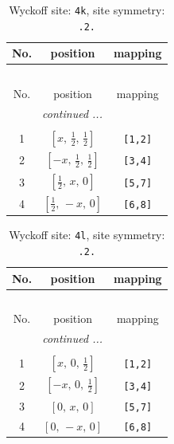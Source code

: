 \documentclass[fleqn,8pt]{jsarticle}
\begin{document}
\renewcommand{\arraystretch}{1.2}
\begin{longtable}{ccc}
\caption{Wyckoff site: {\tt 4k}, site symmetry: {\tt .2.}}
 \\
 \hline \hline
No. & position & mapping \\ \hline \endfirsthead

\multicolumn{2}{l}{\tablename\ \thetable{}} \\
 \hline \hline
No. & position & mapping \\ \hline \endhead

 \hline \hline
\multicolumn{2}{r}{\footnotesize\it continued ...} \\ \endfoot

 \hline \hline
\multicolumn{2}{r}{} \\ \endlastfoot

1 & $\left[ x,\, \frac{1}{2},\, \frac{1}{2} \right]$ & {\tt [1,2]} \\ \hline
2 & $\left[ - x,\, \frac{1}{2},\, \frac{1}{2} \right]$ & {\tt [3,4]} \\ \hline
3 & $\left[ \frac{1}{2},\, x,\, 0 \right]$ & {\tt [5,7]} \\ \hline
4 & $\left[ \frac{1}{2},\, - x,\, 0 \right]$ & {\tt [6,8]} \\
\end{longtable}
\renewcommand{\arraystretch}{1.2}
\begin{longtable}{ccc}
\caption{Wyckoff site: {\tt 4l}, site symmetry: {\tt .2.}}
 \\
 \hline \hline
No. & position & mapping \\ \hline \endfirsthead

\multicolumn{2}{l}{\tablename\ \thetable{}} \\
 \hline \hline
No. & position & mapping \\ \hline \endhead

 \hline \hline
\multicolumn{2}{r}{\footnotesize\it continued ...} \\ \endfoot

 \hline \hline
\multicolumn{2}{r}{} \\ \endlastfoot

1 & $\left[ x,\, 0,\, \frac{1}{2} \right]$ & {\tt [1,2]} \\ \hline
2 & $\left[ - x,\, 0,\, \frac{1}{2} \right]$ & {\tt [3,4]} \\ \hline
3 & $\left[ 0,\, x,\, 0 \right]$ & {\tt [5,7]} \\ \hline
4 & $\left[ 0,\, - x,\, 0 \right]$ & {\tt [6,8]} \\
\end{longtable}
\end{document}
